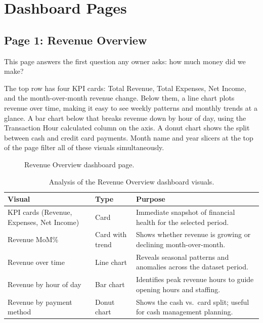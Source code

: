 \documentclass[12pt, a4paper]{report}
\begin{document}
\section{Dashboard Pages}

\subsection{Page 1: Revenue Overview}

This page answers the first question any owner asks: how much money did we make?

The top row has four KPI cards: Total Revenue, Total Expenses, Net Income, and the
month-over-month revenue change. Below them, a line chart plots revenue over time,
making it easy to see weekly patterns and monthly trends at a glance. A bar chart
below that breaks revenue down by hour of day, using the Transaction Hour calculated
column on the axis. A donut chart shows the split between cash and credit card
payments. Month name and year slicers at the top of the page filter all of these
visuals simultaneously.

\begin{figure}[H]
  \centering
  \caption{Revenue Overview dashboard page.\label{fig:dash_revenue}}
\end{figure}

\begin{table}[H]
  \centering
  \caption{Analysis of the Revenue Overview dashboard visuals.\label{tab:rev_analysis}}
  \begin{tabular}{p{3.5cm} p{2.5cm} p{7cm}}
    \toprule
    \textbf{Visual} & \textbf{Type} & \textbf{Purpose} \\
    \midrule
    KPI cards (Revenue, Expenses, Net Income)
      & Card
      & Immediate snapshot of financial health for the selected period. \\[4pt]
    Revenue MoM\%
      & Card with trend
      & Shows whether revenue is growing or declining month-over-month. \\[4pt]
    Revenue over time
      & Line chart
      & Reveals seasonal patterns and anomalies across the dataset period. \\[4pt]
    Revenue by hour of day
      & Bar chart
      & Identifies peak revenue hours to guide opening hours and staffing. \\[4pt]
    Revenue by payment method
      & Donut chart
      & Shows the cash vs.\ card split; useful for cash management planning. \\
    \bottomrule
  \end{tabular}
\end{table}
\end{document}
